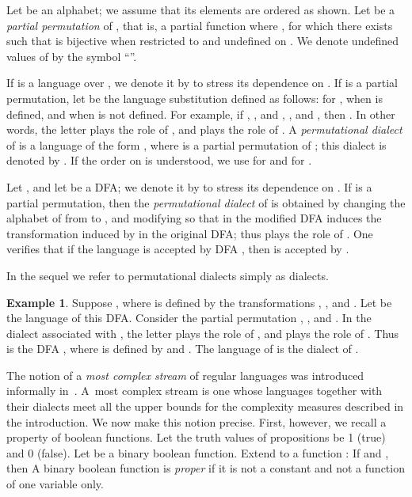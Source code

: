 \documentclass[final]{dmtcs-episciences}
\theoremstyle{definition}
\newtheorem{example}{Example}
\theoremstyle{remark}
\begin{document}
Let  be an alphabet; we assume that its elements are ordered as shown.
Let  be a \emph{partial permutation} of , that is, a partial function  where , for which there exists  such that  is bijective when restricted to  and  undefined on . We denote undefined values of  by the symbol ``''.

If  is a language over , we denote it by  to stress its dependence on .
If  is a partial permutation, let  be the language substitution  defined as follows: 
 for , 
 when  is defined, and  when  is not defined.
For example, if , , and , , and , then .
In other words, the letter  plays the role of , and  plays the role of .
A \emph{permutational dialect} of  is a language of the form 
, where  is a partial permutation of ; this dialect is denoted by
.
If the order on  is understood, we use   for  and 
for .

Let ,  and 
let  be a DFA; we denote it by
 to stress its dependence on .
If  is a partial permutation, then the \emph{permutational dialect} 
 of
 is obtained by changing the alphabet of  from  to , and modifying  so that in the modified DFA 
 induces the transformation induced by   in the original DFA; thus  plays the role of .
One verifies that if the language  is accepted by DFA , then
 is accepted by .

In the sequel we refer to permutational dialects simply as dialects.

\begin{example}
Suppose , where   is defined by the transformations 
, , and . 
 Let  be the language of this DFA. 
Consider the partial permutation , , and . In the dialect associated with , the letter  plays the role of , and  plays the role of . 
Thus 
 is the DFA , where  is defined by 
 and .
The language of  is the dialect  of .
\end{example}



The notion of a \emph{most complex stream} of regular languages was introduced informally in~\cite{Brz13}. 
A~most complex stream is one whose languages together with  their dialects  meet all the upper bounds for the complexity measures described in the introduction.
We now make this notion precise. First, however, we recall a property of boolean functions.
Let the truth values of propositions be 1 (true) and 0 (false). Let  be a binary boolean function.
Extend  to a function
:
If  and , 
then 
A binary boolean function is \emph{proper} if it is not a constant  and not a function of one variable only. 
\end{document}
